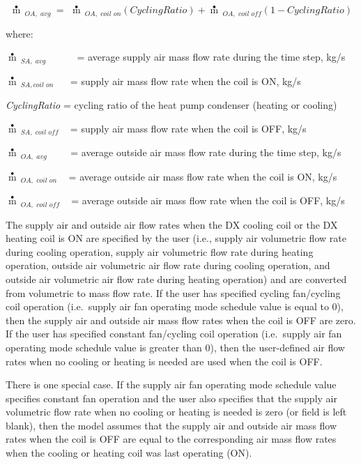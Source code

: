 \begin{equation}
\mathop m\limits^ \bullet  {\,_{OA,\,\,avg\,\,}} = \,\,\mathop m\limits^ \bullet  {\,_{OA,\,\,coil\,\,on}}\left( {CyclingRatio} \right) + \mathop m\limits^ \bullet  {\,_{OA,\,\,coil\,\,off}}\left( {1 - CyclingRatio} \right)
\end{equation}

where:

\(\mathop m\limits^ \bullet {\,_{SA,\,\,avg}}\) ~~~~~ = average supply air mass flow rate during the time step, kg/s

\(\mathop m\limits^ \bullet {\,_{SA,coil\,\,on}}\) ~~ = supply air mass flow rate when the coil is ON, kg/s

\emph{CyclingRatio} = cycling ratio of the heat pump condenser (heating or cooling)

\(\mathop m\limits^ \bullet {\,_{SA,\,\,coil\,\,off}}\) ~ = supply air mass flow rate when the coil is OFF, kg/s

\(\mathop m\limits^ \bullet {\,_{OA,\,\,avg\,\,}}\) ~~~ = average outside air mass flow rate during the time step, kg/s

\(\mathop m\limits^ \bullet {\,_{OA,\,\,coil\,\,on}}\) ~ = average outside air mass flow rate when the coil is ON, kg/s

\(\mathop m\limits^ \bullet {\,_{OA,\,\,coil\,\,off}}\) ~ = average outside air mass flow rate when the coil is OFF, kg/s

The supply air and outside air flow rates when the DX cooling coil or the DX heating coil is ON are specified by the user (i.e., supply air volumetric flow rate during cooling operation, supply air volumetric flow rate during heating operation, outside air volumetric air flow rate during cooling operation, and outside air volumetric air flow rate during heating operation) and are converted from volumetric to mass flow rate. If the user has specified cycling fan/cycling coil operation (i.e.~supply air fan operating mode schedule value is equal to 0), then the supply air and outside air mass flow rates when the coil is OFF are zero. If the user has specified constant fan/cycling coil operation (i.e.~supply air fan operating mode schedule value is greater than 0), then the user-defined air flow rates when no cooling or heating is needed are used when the coil is OFF.

There is one special case. If the supply air fan operating mode schedule value specifies constant fan operation and the user also specifies that the supply air volumetric flow rate when no cooling or heating is needed is zero (or field is left blank), then the model assumes that the supply air and outside air mass flow rates when the coil is OFF are equal to the corresponding air mass flow rates when the cooling or heating coil was last operating (ON).

